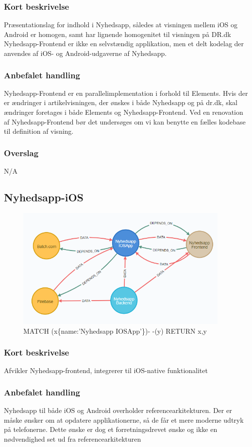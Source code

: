 \documentclass{article}
\begin{document}
\subsubsection{Kort beskrivelse}
Præsentationslag for indhold i Nyhedsapp, således at visningen mellem iOS og Android er homogen, samt har lignende homogenitet til visningen på DR.dk
Nyhedsapp-Frontend er ikke en selvstændig applikation, men et delt kodelag der anvendes af iOS- og Android-udgaverne af Nyhedsapp. 
\subsubsection{Anbefalet handling}
Nyhedsapp-Frontend er en parallelimplementation i forhold til Elements. Hvis der er ændringer i artikelvisningen, der ønskes i både Nyhedsapp og på dr.dk,  skal ændringer foretages i både Elements og Nyhedsapp-Frontend. Ved en renovation af Nyhedsapp-Frontend bør det undersøges om vi kan benytte en fælles kodebase til definition af visning.
\subsubsection{Overslag}
N/A

\subsection{Nyhedsapp-iOS}
\begin{figure}[h]
\includegraphics[width=300pt]{Nyhedsapp-IOS.PNG}
\caption{MATCH (x\{name:'Nyhedsapp IOSApp'\})- -(y) RETURN x,y}
\end{figure}
\subsubsection{Kort beskrivelse}
Afvikler Nyhedsapp-frontend, integrerer til iOS-native funktionalitet
\subsubsection{Anbefalet handling}
Nyhedsapp til både iOS og Android overholder referencearkitekturen. Der er måske ønsker om at opdatere applikationerne, så de får et mere moderne udtryk på telefonerne. Dette ønske er dog et forretningsdrevet ønske og ikke en nødvendighed set ud fra referencearkitekturen
\end{document}
